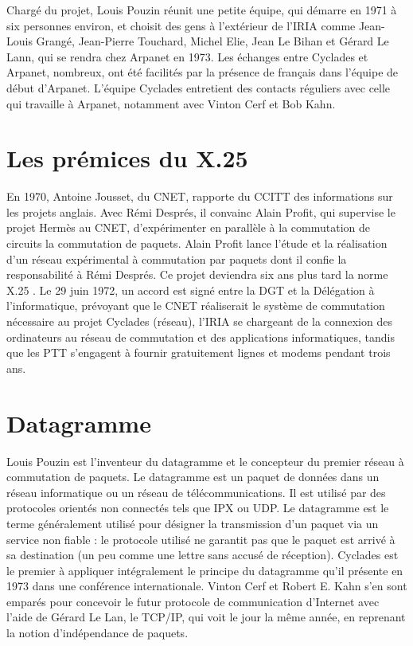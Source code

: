 \documentclass[12pt]{report}
\begin{document}
Chargé du projet, Louis Pouzin réunit une petite équipe, qui démarre en 1971 à six personnes environ, et choisit des gens à l’extérieur de l’IRIA comme Jean-Louis Grangé, Jean-Pierre Touchard, Michel Elie, Jean Le Bihan et Gérard Le Lann, qui se rendra chez Arpanet en 1973. Les échanges entre Cyclades et Arpanet, nombreux, ont été facilités par la présence de français dans l'équipe de début d'Arpanet. L'équipe Cyclades entretient des contacts réguliers avec celle qui travaille à Arpanet, notamment avec Vinton Cerf et Bob Kahn.

\section{Les prémices du X.25}

En 1970, Antoine Jousset, du \gls{CNET}, rapporte du \gls{CCITT} des informations sur les projets anglais. Avec Rémi Després, il convainc Alain Profit, qui supervise le projet Hermès au CNET, d’expérimenter en parallèle à la commutation de circuits la commutation de paquets. Alain Profit lance l'étude et la réalisation d'un réseau expérimental à commutation par paquets dont il confie la responsabilité à Rémi Després. Ce projet deviendra six ans plus tard la norme X.25 \cite{wikicnet}. Le 29 juin 1972, un accord est signé entre la DGT et la Délégation à l’informatique, prévoyant que le CNET réaliserait le système de commutation nécessaire au projet Cyclades (réseau), l’IRIA se chargeant de la connexion des ordinateurs au réseau de commutation et des applications informatiques, tandis que les \gls{PTT} s’engagent à fournir gratuitement lignes et modems pendant trois ans.

\section{Datagramme}

Louis Pouzin est l'inventeur du datagramme et le concepteur du premier réseau à commutation de paquets.
Le datagramme est un paquet de données dans un réseau informatique ou un réseau de télécommunications. Il est utilisé par des protocoles orientés \og non connectés \fg{} tels que IPX ou UDP. Le datagramme est le terme généralement utilisé pour désigner la transmission d'un paquet via un service non \og fiable \fg{} : le protocole utilisé ne garantit pas que le paquet est arrivé à sa destination (un peu comme une lettre sans accusé de réception). Cyclades est le premier à appliquer intégralement le principe du datagramme  qu'il présente en 1973 dans une conférence internationale. Vinton Cerf et Robert E. Kahn s'en sont emparés pour concevoir le futur protocole de communication d'Internet avec l'aide de Gérard Le Lan, le TCP/IP, qui voit le jour la même année, en reprenant la notion d'indépendance de paquets\cite{wikidtg}.
\end{document}
